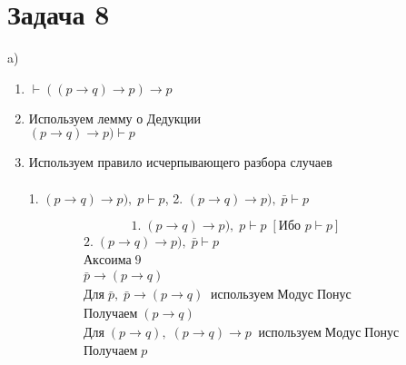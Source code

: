\documentclass[a4paper, 12pt]{article} %
\begin{document}
\section*{Задача 8}
a) \begin{enumerate}
    \item $\vdash ((p \rightarrow q) \rightarrow p) \rightarrow p$ \\
    \item  Используем лемму о Дедукции \\ 
    $(p \rightarrow q) \rightarrow p) \vdash p$ \\
    \item Используем правило исчерпывающего разбора случаев \\
    \\ 1. $(p \rightarrow q) \rightarrow p), \; p \vdash p$,
     2. $(p \rightarrow q) \rightarrow p), \; \bar p \vdash p$
\end{enumerate}
\[1. \;(p \rightarrow q) \rightarrow p), \; p \vdash p \; [\text{Ибо } p \vdash p] \]
\begin{align*}
    &2.\;(p \rightarrow q) \rightarrow p), \; \bar p \vdash p \\
    &Аксоима \; 9 \\ 
    &\bar{p} \rightarrow (p \rightarrow q) \\
    &Для \; \bar{p}, \; \bar{p} \rightarrow (p \rightarrow q) \; 
    \; используем \; Модус \; Понус  \\
    & Получаем \; (p \rightarrow q) \\
    &Для \; (p \rightarrow q), \; (p \rightarrow q) \rightarrow p \; 
    \; используем \; Модус \; Понус \\
    & Получаем \; p
\end{align*}
\end{document}
